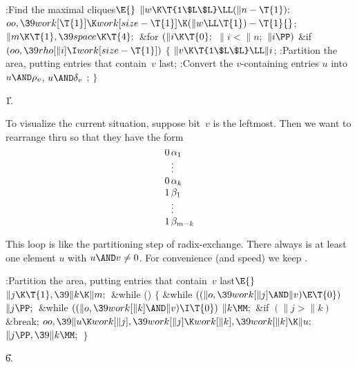 \Y\B\4:Find the maximal cliques\X${}\E{}$\6
$\|w\K\T{1\$L\$L}\LL(\|n-\T{1});{}$\6
${}\\{oo},\39\\{work}[\T{1}]\K\\{work}[\\{size}-\T{1}]\K(\|w\LL\T{1})-\T{1}{}$;%
\6
${}\|m\K\T{1},\39\\{space}\K\T{4};{}$\6
\&{for} ${}(\|i\K\T{0};{}$ ${}\|i<\|n;{}$ ${}\|i\PP){}$\1\6
\&{if} ${}(\\{oo},\39\\{rho}[\|i]\I\\{work}[\\{size}-\T{1}]){}$\5
${}\{{}$\1\6
${}\|v\K\T{1\$L\$L}\LL\|i{}$;\6
:Partition the  area, putting entries that contain~$v$ last\X;\6
:Convert the $v$-containing entries $u$ into $u\AND\rho_v$, $u\AND\delta_v$%
\X;\6
\4${}\}{}$\2\2\par
\U1.\fi

To visualize the current situation, suppose bit~$v$ is
the leftmost.
Then we want to rearrange  thru  so that
they have the form
$$\vcenter{\halign{#\thinspace&$#$\hfil\cr
0&\alpha_1\cr
&\vdots\cr
0&\alpha_k\cr
1&\beta_1\cr
&\vdots\cr
1&\beta_{m-k}\cr}}$$

This loop is like the partitioning step of radix-exchange.
There always is at least one element $u$ with $u\AND v\ne0$.
For convenience (and speed) we keep .

\Y\B\4:Partition the  area, putting entries that contain~$v$
last\X${}\E{}$\6
$\|j\K\T{1},\39\|k\K\|m;{}$\6
\&{while} ()\5
${}\{{}$\1\6
\&{while} ${}((\|o,\39\\{work}[\|j]\AND\|v)\E\T{0}){}$\1\5
${}\|j\PP;{}$\2\6
\&{while} ${}((\|o,\39\\{work}[\|k]\AND\|v)\I\T{0}){}$\1\5
${}\|k\MM;{}$\2\6
\&{if} ${}(\|j>\|k){}$\1\5
\&{break};\2\6
${}\\{oo},\39\|u\K\\{work}[\|j],\39\\{work}[\|j]\K\\{work}[\|k],\39\\{work}[%
\|k]\K\|u;{}$\6
${}\|j\PP,\39\|k\MM;{}$\6
\4${}\}{}$\2\par
\U6.\fi

